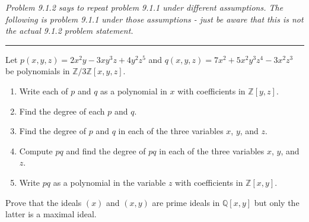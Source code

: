\documentclass[12pt,letterpaper]{hmcpset}
\newcommand{\Zz}{\mathbb{Z}}
\newcommand{\Qq}{\mathbb{Q}}
\begin{document}
\begin{problem}[9.1.2]
	\textit{Problem 9.1.2 says to repeat problem 9.1.1 under different assumptions. The following is problem 9.1.1 under those assumptions - just be aware that this is not the actual 9.1.2 problem statement.}
	
	\hrule \vspace*{1mm}
	
	Let $p(x,y,z)=2x^2y-3xy^3z+4y^2z^5$ and $q(x,y,z)=7x^2+5x^2y^3z^4-3x^2z^3$ be polynomials in $\Zz/3\Zz[x,y,z]$.
	\begin{enumerate}
		\item Write each of $p$ and $q$ as a polynomial in $x$ with coefficients in $\Zz[y,z]$.
		\item Find the degree of each $p$ and $q$.
		\item Find the degree of $p$ and $q$ in each of the three variables $x$, $y$, and $z$.
		\item Compute $pq$ and find the degree of $pq$ in each of the three variables $x$, $y$, and $z$.
		\item Write $pq$ as a polynomial in the variable $z$ with coefficients in $\Zz[x,y]$.
	\end{enumerate}
\end{problem}
\begin{solution}
	\vfill
\end{solution}
\newpage

\begin{problem}[9.1.4]
  Prove that the ideals $(x)$ and $(x,y)$ are prime ideals in $\Qq[x,y]$ but only the latter is a maximal ideal.
\end{problem}
\begin{solution}
	\vfill
\end{solution}
\end{document}
